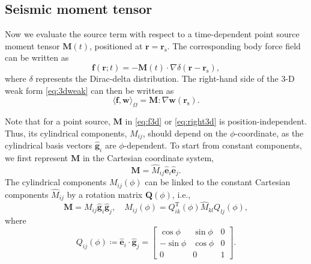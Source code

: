 \documentclass[extra]{gji}
\begin{document}
\subsection{Seismic moment tensor}
\label{sec:moment}
Now we evaluate the source term with respect to  
a time-dependent point source moment tensor $\mathbf{M}\left(t\right)$, 
positioned at $\mathbf{r}=\mathbf{r}_\text{s}$.  
The corresponding body force field can be written as
\begin{equation}
  \mathbf{f}\left(\mathbf{r};t\right)=
  -\mathbf{M}\left(t\right)\cdot\nabla\delta\left(\mathbf{r}-
  \mathbf{r}_{\text{s}}\right),
  \label{eq:f3d}
\end{equation}
where $\delta$ represents the Dirac-delta distribution. 
The right-hand side of the 3-D weak form \eqref{eq:3dweak} 
can then be written as
\begin{equation}
  \langle \mathbf{f},\mathbf{w}\rangle_{\Omega}=
  \mathbf{M}:  \nabla\mathbf{w}\left(\mathbf{r}_{\text{s}}\right).
  \label{eq:right3d}
\end{equation}

Note that for a point source, $\mathbf{M}$ in \eqref{eq:f3d} or 
\eqref{eq:right3d} is position-independent. 
Thus, its cylindrical components, $M_{ij}$, should depend on the $\phi$-coordinate, 
as the cylindrical basis vectors $\hat{\mathbf{g}}_{i}$ are $\phi$-dependent. 
To start from constant components, we first
represent $\mathbf{M}$ in the Cartesian coordinate system,
\begin{equation}
  \mathbf{M}=\hat{M}_{ij}\hat{\mathbf{e}}_{i}\hat{\mathbf{e}}_{j}.
\end{equation}
The cylindrical components $M_{ij}\left(\phi\right)$ can be linked to the constant 
Cartesian components $\hat{M}_{ij}$ 
by a rotation matrix $\mathbf{Q}\left(\phi\right)$, i.e.,
\begin{equation}
  \mathbf{M}=M_{ij}\hat{\mathbf{g}}_{i}\hat{\mathbf{g}}_{j},\quad 
  M_{ij}\left(\phi\right)=Q^\text{T}_{ik}\left(\phi\right)\hat{M}_{kl}Q_{lj}\left(\phi\right), 
  \label{eq:mij}
\end{equation}
where
\begin{equation}
  Q_{ij}\left(\phi\right) \coloneqq \hat{\mathbf{e}}_{i}\cdot\hat{\mathbf{g}}_{j} =
  \begin{bmatrix}
    \cos\phi & \sin\phi & 0 \\
    -\sin\phi & \cos\phi & 0 \\
    0 & 0 & 1
  \end{bmatrix}.
\end{equation}
\end{document}
